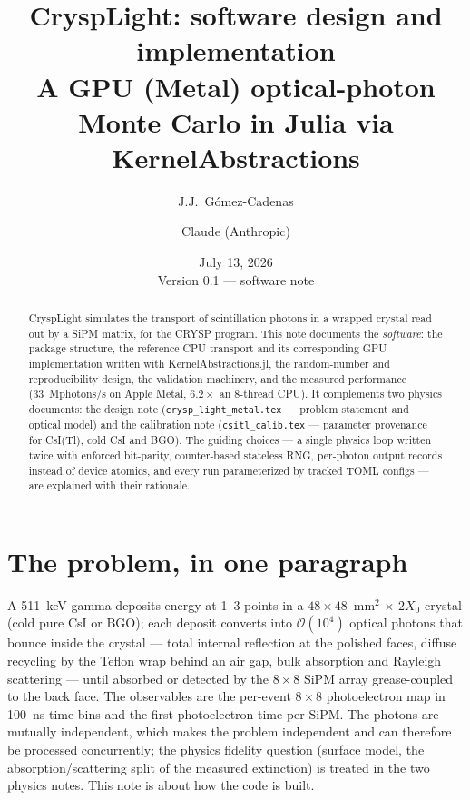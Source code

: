 \documentclass[11pt,a4paper]{article}
\title{CryspLight: software design and implementation\\
\large A GPU (Metal) optical-photon Monte Carlo in Julia via KernelAbstractions}
\author{J.J.~G\'omez-Cadenas \and Claude (Anthropic)}
\date{July 13, 2026 \\[2mm] \small Version 0.1 --- software note}
\newcommand{\code}[1]{\texttt{#1}}
\begin{document}
\maketitle

\begin{abstract}
CryspLight simulates the transport of scintillation photons in a wrapped crystal read
out by a SiPM matrix, for the CRYSP program. This note documents the \emph{software}:
the package structure, the reference CPU transport and its corresponding GPU implementation written with
KernelAbstractions.jl, the random-number and reproducibility design, the validation
machinery, and the measured performance (33~Mphotons/s on Apple Metal, $6.2\times$ an
8-thread CPU). It complements two physics documents: the design note
(\code{crysp\_light\_metal.tex} --- problem statement and optical model) and the
calibration note (\code{csitl\_calib.tex} --- parameter provenance for CsI(Tl), cold
CsI and BGO). The guiding choices --- a single physics loop written twice with enforced
bit-parity, counter-based stateless RNG, per-photon output records instead of device
atomics, and every run parameterized by tracked TOML configs --- are explained with
their rationale.
\end{abstract}

\tableofcontents

\section{The problem, in one paragraph}

A 511~keV gamma deposits energy at 1--3 points in a $48\times48$~mm$^2$ $\times$
$2X_0$ crystal (cold pure CsI or BGO); each deposit converts into
$\mathcal{O}(10^4)$ optical photons that bounce inside the crystal --- total internal
reflection at the polished faces, diffuse recycling by the Teflon wrap behind an air
gap, bulk absorption and Rayleigh scattering --- until absorbed or detected by the
$8\times8$ SiPM array grease-coupled to the back face. The observables are the
per-event $8\times8$ photoelectron map in 100~ns time bins and the first-photoelectron
time per SiPM. The photons are mutually independent, which makes the problem
independent and can therefore be processed concurrently; the physics fidelity question (surface model, the
absorption/scattering split of the measured extinction) is treated in the two physics
notes. This note is about how the code is built.
\end{document}
